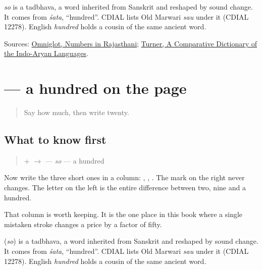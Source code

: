 \begin{cousinweb}
\emph{so} is a tadbhava, a word inherited from Sanskrit and reshaped by sound change. It comes from \emph{śata}, \textquotedblleft{}hundred\textquotedblright{}. CDIAL lists Old Marwari \emph{sau} under it (CDIAL 12278). English \emph{hundred} holds a cousin of the same ancient word.
\end{cousinweb}

\begin{tcolorbox}[breakable,colback=teal!4,colframe=teal!35!black,title={Before you move on}]
Sources: \href{https://www.omniglot.com/language/numbers/rajasthani.htm}{Omniglot, Numbers in Rajasthani}; \href{https://dsal.uchicago.edu/dictionaries/soas/}{Turner, A Comparative Dictionary of the Indo-Aryan Languages}.
\end{tcolorbox}
\section[\texorpdfstring{\mw{सो} (so)}{सो (so)}]{ — a hundred on the page}

\label{lesson:MW-C34-so}



\begin{quote}
Say how much, then write twenty.
\end{quote}

\subsection*{What to know first}
\begin{quote}
\textbf{} + \textbf{} $\to$ \textbf{} — \emph{so} — a hundred
\end{quote}

Now write the three short ones in a column: \textbf{}, \textbf{}, \textbf{}. The mark on the right never changes. The letter on the left is the entire difference between two, nine and a hundred.

That column is worth keeping. It is the one place in this book where a single mistaken stroke changes a price by a factor of fifty.

\begin{cousinweb}
\textbf{} (\emph{so}) is a tadbhava, a word inherited from Sanskrit and reshaped by sound change. It comes from \emph{śata}, \textquotedblleft{}hundred\textquotedblright{}. CDIAL lists Old Marwari \emph{sau} under it (CDIAL 12278). English \emph{hundred} holds a cousin of the same ancient word.
\end{cousinweb}

